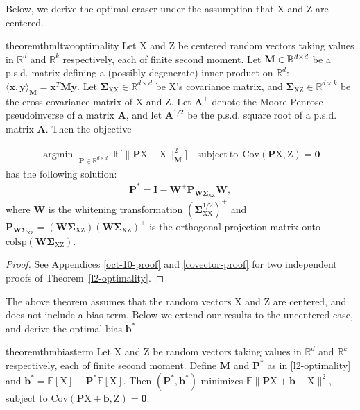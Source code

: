\documentclass{article}
\theoremstyle{plain}
\theoremstyle{remark}
\newcommand{\sxx}{\mathbf \Sigma_{\rv X \rv X}}
\newcommand{\sxz}{\mathbf \Sigma_{\rv X \rv Z}}
\newcommand{\pwxz}{\mathbf P_{\mathbf{W}\sxz}}
\newcommand{\optproblem}{
    \begin{align*}
        \mathop{\mathrm{argmin\:}}_{\substack{\mathbf{P} \in \mathbb{R}^{d \times d}}} \E \Big [ \big\| \mathbf{P}\rv X - \rv X \big\|^2_{\mathbf M} \Big ]\quad \mathrm{subject\:to}\:\: \mathrm{Cov}(\mathbf{P}\rv X, \rv Z) = \mathbf{0}
    \end{align*}}
\newcommand{\E}{\mathbb E}
\newcommand{\R}{\mathbb{R}}
\theoremstyle{plain}
\theoremstyle{TheoremNum}
\newcommand{\rv}[1]{{\mathrm{#1}}}
\renewcommand{\R}{{\color{black} \mathbb{R}}}
\begin{document}
Below, we derive the optimal eraser under the assumption that $\rv X$ and $\rv Z$ are centered.

\begin{restatable}{theorem}{thmltwooptimality}
    \label{l2-optimality}
    Let $\rv X$ and $\rv Z$ be centered random vectors taking values in $\mathbb R^d$ and $\mathbb R^k$ respectively, each of finite second moment. Let $\mathbf M \in \R^{d \times d}$ be a p.s.d. matrix defining a (possibly degenerate) inner product on $\mathbb R^d$: $\langle \mathbf{x}, \mathbf{y} \rangle_\mathbf{M} = \mathbf{x}^T\mathbf{My}$. Let $\sxx \in \mathbb R^{d \times d}$ be $\rv X$'s covariance matrix, and $\sxz \in \mathbb R^{d \times k}$ be the cross-covariance matrix of $\rv X$ and $\rv Z$. Let $\mathbf A^+$ denote the Moore-Penrose pseudoinverse of a matrix $\mathbf A$, and let $\mathbf A^{1/2}$ be the p.s.d. square root of a p.s.d. matrix $\mathbf A$. Then the objective
    \optproblem
    has the following solution:
    \begin{align*}
        \mathbf{P^*} = \mathbf{I} - \mathbf{W}^+ \pwxz\mathbf{W},
    \end{align*}
    where $\mathbf{W}$ is the whitening transformation $(\sxx^{1/2})^+$ and $\pwxz = (\mathbf{W}\sxz)(\mathbf{W}\sxz)^+$ is the orthogonal projection matrix onto $\mathrm{colsp}(\mathbf{W}\sxz)$.
\end{restatable}

\begin{proof}
    See Appendices \ref{oct-10-proof} and \ref{covector-proof} for two independent proofs of Theorem~\ref{l2-optimality}.
\end{proof}

The above theorem assumes that the random vectors $\rv X$ and $\rv Z$ are centered, and does not include a bias term. Below we extend our results to the uncentered case, and derive the optimal bias $\mathbf{b^*}$.

\begin{restatable}{theorem}{thmbiasterm}\label{bias-term}
    Let $\rv X$ and $\rv Z$ be random vectors taking values in $\mathbb R^d$ and $\mathbb R^k$ respectively, each of finite second moment. Define $\mathbf{M}$ and $\mathbf{P^*}$ as in \autoref{l2-optimality} and $\mathbf{b^*} = \E[\rv X] - \mathbf{P^*}\E[\rv X]$. Then $(\mathbf{P^*}, \mathbf{b^*})$ minimizes $\E \big\|\mathbf{P}\rv X + \mathbf{b} - \rv X \big\|^2$, subject to $\mathrm{Cov}(\mathbf{P}\rv X + \mathbf{b}, \rv Z) = \mathbf{0}$.
\end{restatable}
\end{document}
